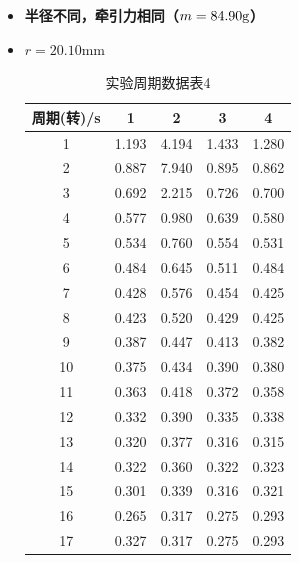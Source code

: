\documentclass[12pt,hyperref,a4paper,UTF8]{ctexart}
\begin{document}
\begin{itemize}
        \item \textbf{半径不同，牵引力相同（$ m=84.90\text g $）}
            \item $r=20.10\text{mm}$
                \begin{table}[h!]
                    \centering
                    \begin{tabular}{ccccc}
                    \toprule
                    \textbf{周期(转)/s} & \textbf{1} & \textbf{2} & \textbf{3} & \textbf{4} \\
                    \midrule
                    1  & 1.193 & 4.194 & 1.433 & 1.280 \\
                    2  & 0.887 & 7.940 & 0.895 & 0.862 \\
                    3  & 0.692 & 2.215 & 0.726 & 0.700 \\
                    4  & 0.577 & 0.980 & 0.639 & 0.580 \\
                    5  & 0.534 & 0.760 & 0.554 & 0.531 \\
                    6  & 0.484 & 0.645 & 0.511 & 0.484 \\
                    7  & 0.428 & 0.576 & 0.454 & 0.425 \\
                    8  & 0.423 & 0.520 & 0.429 & 0.425 \\
                    9  & 0.387 & 0.447 & 0.413 & 0.382 \\
                    10 & 0.375 & 0.434 & 0.390 & 0.380 \\
                    11 & 0.363 & 0.418 & 0.372 & 0.358 \\
                    12 & 0.332 & 0.390 & 0.335 & 0.338 \\
                    13 & 0.320 & 0.377 & 0.316 & 0.315 \\
                    14 & 0.322 & 0.360 & 0.322 & 0.323 \\
                    15 & 0.301 & 0.339 & 0.316 & 0.321 \\
                    16 & 0.265 & 0.317 & 0.275 & 0.293 \\
                    17 & 0.327 & 0.317 & 0.275 & 0.293 \\
                    \bottomrule
                    \end{tabular}
                    \caption{实验周期数据表4}
                    \end{table}
                    

\end{itemize}
\end{document}
